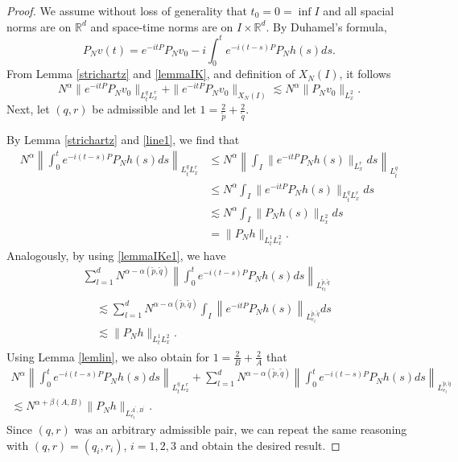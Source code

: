 \documentclass[10pt,leqno]{amsart}
\newcommand{\R}{\mathbb{R}}
\numberwithin{equation}{section}
\begin{document}
\begin{proof}
We assume without loss of generality that $t_0 = 0=\inf I$ and all spacial norms are on $\R^d$ and space-time norms are on $I \times \R^d$. By Duhamel's formula,
$$P_N v(t)= e^{-it P}P_N v_0 - i \int_0^t e^{-i(t-s) P} P_N h(s) ds. $$
From Lemma \ref{strichartz} and \ref{lemmaIK}, and definition of $X_N(I)$, it follows
$$N^\alpha \|e^{-it P} P_N v_0 \|_{L_t^q L_x^r } + \|e^{-it P} P_N v_0 \|_{X_N (I)} \lesssim N^\alpha \|P_N v_0\|_{L_x^2}.$$
Next, let $(q, r)$ be  admissible and let $1= \frac{2}{\tilde{p}} +\frac{2}{\tilde{q}}$. 


By Lemma \ref{strichartz} and \eqref{line1}, we find that 
\begin{align*}
N^\alpha  \left\|\int_0^t e^{-i(t-s) P} P_N h(s) ds\right\|_{L_t^q L_x^r } 
 &\leq N^\alpha  \left\|\int_I \|e^{- i t P} P_N h(s)\|_{L_x^r} ds\right\|_{L_t^q} 
 \\
 &\leq N^\alpha  
\int_I \|e^{- i t P} P_N h(s)\|_{L_t^qL_x^r} ds
\\
& \lesssim N^\alpha \int_I \|P_N h(s)\|_{L^2_x} ds \\
&= \|P_N h\|_{L^1_tL^2_x}.
\end{align*}
Analogously, by using \eqref{lemmaIKe1}, we have
\begin{multline*}
\sum_{l=1}^d N^{\alpha -\alpha (\tilde{p},\tilde q)} \left\|\int_0^t e^{-i(t-s) P} P_N h(s) ds\right\|_{L_{e_l}^{\tilde{p},\tilde q}  } \\
\begin{aligned}
 & \lesssim 
 \sum_{l=1}^d N^{\alpha -\alpha (\tilde{p},\tilde q)} \int_I \left\| e^{-it P} P_N h(s) \right\|_{L_{e_l}^{\tilde{p},\tilde q}  } ds \\
 &\lesssim \|P_N h\|_{L^1_tL^2_x}.
\end{aligned}
\end{multline*}
Using Lemma \ref{lemlin}, we also obtain for $1= \frac{2}{B} +\frac{2}{A}$ that
\begin{multline*}
N^\alpha  \left\|\int_0^t e^{-i(t-s) P} P_N h(s) ds\right\|_{L_t^q L_x^r} + \sum_{l=1}^d N^{\alpha -\alpha (\tilde{p},\tilde q )}   
\left\|\int_0^t e^{-i(t-s) P} P_N h(s) ds\right\|_{L_{e_l}^{\tilde{p},\tilde q}  }\\
 \lesssim N^{\alpha +\beta (A,B)}  \|P_N h\|_{L_{e_l}^{A^\prime ,B^\prime} } .
\end{multline*}
Since $(q, r)$ was an arbitrary admissible pair, we can repeat the same reasoning with $(q, r) = (q_i, r_i)$, $i = 1, 2, 3$ and obtain the desired result.
\end{proof}
\end{document}
